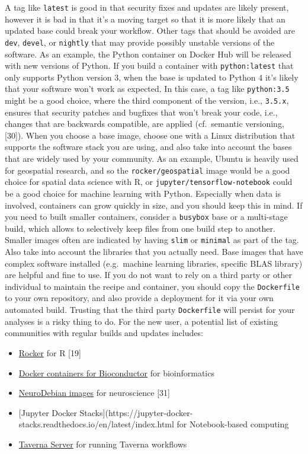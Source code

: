 \documentclass[10pt,letterpaper]{article}
\providecommand{\tightlist}{%
  \setlength{\itemsep}{0pt}\setlength{\parskip}{0pt}}
\begin{document}
A tag like \texttt{latest} is good in that security fixes and updates
are likely present, however it is bad in that it's a moving target so
that it is more likely that an updated base could break your workflow.
Other tags that should be avoided are \texttt{dev}, \texttt{devel}, or
\texttt{nightly} that may provide possibly unstable versions of the
software. As an example, the Python container on Docker Hub will be
released with new versions of Python. If you build a container with
\texttt{python:latest} that only supports Python version 3, when the
base is updated to Python 4 it's likely that your software won't work as
expected. In this case, a tag like \texttt{python:3.5} might be a good
choice, where the third component of the version, i.e., \texttt{3.5.x},
ensures that security patches and bugfixes that won't break your code,
i.e., changes that are backwards compatible, are applied (cf.~semantic
versioning, {[}30{]}). When you choose a base image, choose one with a
Linux distribution that supports the software stack you are using, and
also take into account the bases that are widely used by your community.
As an example, Ubuntu is heavily used for geospatial research, and so
the \texttt{rocker/geospatial} image would be a good choice for spatial
data science with R, or \texttt{jupyter/tensorflow-notebook} could be a
good choice for machine learning with Python. Especially when data is
involved, containers can grow quickly in size, and you should keep this
in mind. If you need to built smaller containers, consider a
\texttt{busybox} base or a multi-stage build, which allows to
selectively keep files from one build step to another. Smaller images
often are indicated by having \texttt{slim} or \texttt{minimal} as part
of the tag. Also take into account the libraries that you actually need.
Base images that have complex software installed (e.g.~machine learning
libraries, specific BLAS library) are helpful and fine to use. If you do
not want to rely on a third party or other individual to maintain the
recipe and container, you should copy the \texttt{Dockerfile} to your
own repository, and also provide a deployment for it via your own
automated build. Trusting that the third party \texttt{Dockerfile} will
persist for your analyses is a risky thing to do. For the new user, a
potential list of existing communities with regular builds and updates
includes:

\begin{itemize}
\tightlist
\item
  \href{https://www.rocker-project.org/}{Rocker} for R {[}19{]}
\item
  \href{https://bioconductor.org/help/docker/}{Docker containers for
  Bioconductor} for bioinformatics
\item
  \href{https://hub.docker.com/_/neurodebian}{NeuroDebian images} for
  neuroscience {[}31{]}
\item
  {[}Jupyter Docker
  Stacks{]}(https://jupyter-docker-stacks.readthedocs.io/en/latest/index.html
  for Notebook-based computing
\item
  \href{https://hub.docker.com/r/taverna/taverna-server}{Taverna Server}
  for running Taverna workflows
\end{itemize}
\end{document}
